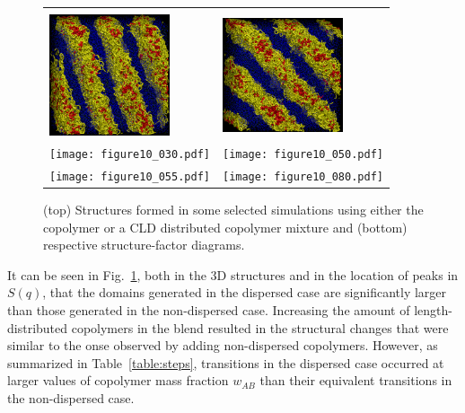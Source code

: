 \documentclass[
journal=mamobx,
manuscript=article,
]{achemso}
\begin{document}
\begin{figure}
\begin{tabular}{C{1.6in}@{}C{1.6in}}
		  \\ \includegraphics[width=1.4in]{A5B5_080} & \includegraphics[width=1.4in]{A5B5_Flory_080} \\
		\texttt{[image: figure10\_030.pdf]} & \texttt{[image: figure10\_050.pdf]} \\
		\texttt{[image: figure10\_055.pdf]} & \texttt{[image: figure10\_080.pdf]}
	\end{tabular}
	\caption{(top) Structures formed in some selected simulations using either the  copolymer or a CLD distributed copolymer mixture and (bottom) respective structure-factor diagrams.}
	\label{fig:Figure_10}
\end{figure}

It can be seen in Fig.~\ref{fig:Figure_10}, both in the 3D structures and in the location of peaks in $S(q)$, that the domains generated in the dispersed case are significantly larger than those generated in the non-dispersed case.
Increasing the amount of length-distributed copolymers in the blend resulted in the structural changes that were similar to the onse observed by adding non-dispersed copolymers.
However, as summarized in Table~\ref{table:steps}, transitions in the dispersed case occurred at larger values of copolymer mass fraction $w_{AB}$ than their equivalent transitions in the non-dispersed case.
\end{document}
